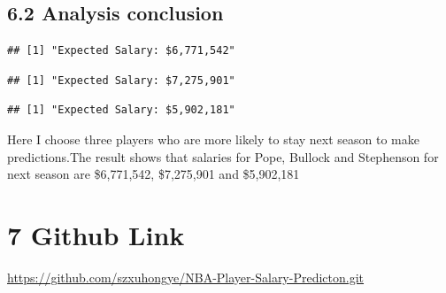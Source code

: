 \documentclass[]{article}
\begin{document}
\subsection{6.2 Analysis conclusion}\label{analysis-conclusion}

\begin{verbatim}
## [1] "Expected Salary: $6,771,542"
\end{verbatim}

\begin{verbatim}
## [1] "Expected Salary: $7,275,901"
\end{verbatim}

\begin{verbatim}
## [1] "Expected Salary: $5,902,181"
\end{verbatim}

Here I choose three players who are more likely to stay next season to
make predictions.The result shows that salaries for Pope, Bullock and
Stephenson for next season are \$6,771,542, \$7,275,901 and \$5,902,181

\section{7 Github Link}\label{github-link}

\url{https://github.com/szxuhongye/NBA-Player-Salary-Predicton.git}
\end{document}
